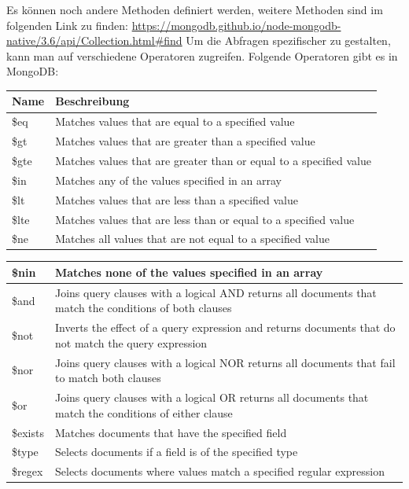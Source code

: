 \cite{mongodb_query_methods}
\newline
Es können noch andere Methoden definiert werden, weitere Methoden sind im folgenden Link zu finden:
\newline
\url{https://mongodb.github.io/node-mongodb-native/3.6/api/Collection.html#find}
\newline
Um die Abfragen spezifischer zu gestalten, kann man auf verschiedene Operatoren zugreifen. Folgende Operatoren gibt es in MongoDB:
\begin{center}
    \begin{tabular}{ | m{1.5cm} | m{13cm} | } 
        \hline
        Name & Beschreibung \\ [0.5ex] 
        \hline\hline
        \$eq & Matches values that are equal to a specified value \\
        \hline
        \$gt & Matches values that are greater than a specified value \\
        \hline
        \$gte & Matches values that are greater than or equal to a specified value \\
        \hline
        \$in & Matches any of the values specified in an array \\
        \hline
        \$lt & Matches values that are less than a specified value \\
        \hline
        \$lte & Matches values that are less than or equal to a specified value \\
        \hline
        \$ne & Matches all values that are not equal to a specified value \\
    \end{tabular}
\end{center}
\begin{center}
    \begin{tabular}{ | m{1.5cm} | m{13cm} | }
        \$nin & Matches none of the values specified in an array \\
        \hline
        \$and & Joins query clauses with a logical AND returns all documents that match the conditions of both clauses \\
        \hline
        \$not & Inverts the effect of a query expression and returns documents that do not match the query expression \\
        \hline
        \$nor & Joins query clauses with a logical NOR returns all documents that fail to match both clauses \\
        \hline
        \$or & Joins query clauses with a logical OR returns all documents that match the conditions of either clause \\
        \$exists & Matches documents that have the specified field \\
        \hline
        \$type & Selects documents if a field is of the specified type \\
        \hline
        \$regex & Selects documents where values match a specified regular expression \\
        \hline
    \end{tabular}
\end{center}
